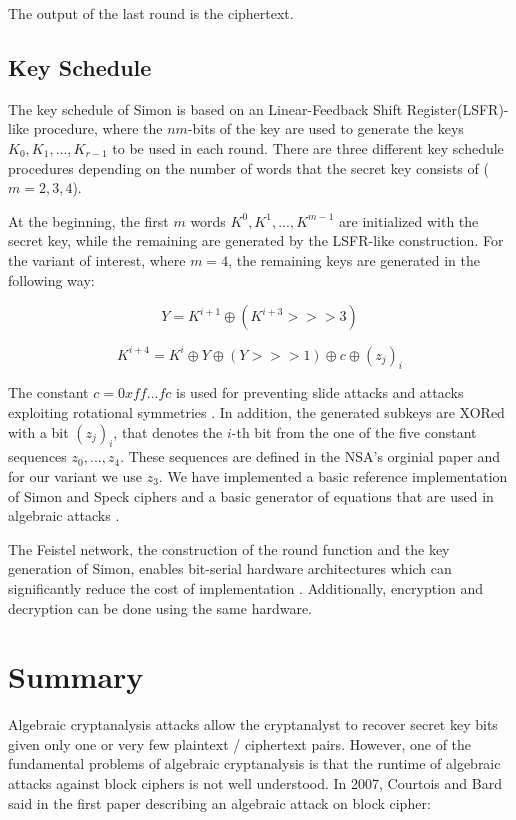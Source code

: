 The output of the last round is the ciphertext.
\subsection{Key Schedule}
The key schedule of Simon is based on an Linear-Feedback Shift Register(LSFR)-like procedure, where the $nm$-bits of the key are used to generate the keys $K_0,K_1,...,K_{r-1}$ to be used in each round. There are three different key schedule procedures depending on the number of words that the secret key consists of ($m=2,3,4$).

At the beginning, the first $m$ words $K^0,K^1,...,K^{m-1}$ are initialized with the secret key, while the remaining are generated by the LSFR-like construction. For the variant of  interest, where $m=4$, the remaining keys are generated in the following way:

\begin{equation}
Y=K^{i+1}\oplus (K^{i+3}>>>3)
\end{equation}

\begin{equation}
K^{i+4}=K^i\oplus Y \oplus (Y>>>1)\oplus c\oplus (z_j)_i
\end{equation}

The constant $c=0xff...fc$ is used for preventing slide attacks and attacks exploiting rotational symmetries \cite{NSAciphers}. In addition, the generated subkeys are XORed with a bit $(z_j)_i$, that denotes the $i$-th bit from the one of the five constant sequences $z_0,...,z_4$. These sequences are defined in the NSA's orginial paper \cite{NSAciphers} and for our variant we use $z_3$. We have implemented a basic reference implementation of Simon and Speck ciphers and a basic generator of equations that are used in algebraic attacks \cite{simonref} .

The Feistel network, the construction of the round function and the key generation of Simon, enables bit-serial hardware architectures which can significantly reduce the cost of implementation \cite{simoneff}. Additionally, encryption and decryption can be done using the
same hardware.

\section{Summary} \label{sec:ACCxty}
Algebraic cryptanalysis attacks allow the cryptanalyst to recover secret key bits given only one or very few plaintext / ciphertext pairs. However, one of the fundamental problems of algebraic cryptanalysis is that the runtime of algebraic attacks against block ciphers is not well understood. In 2007, Courtois and Bard said in the first paper describing an algebraic attack on block cipher:

